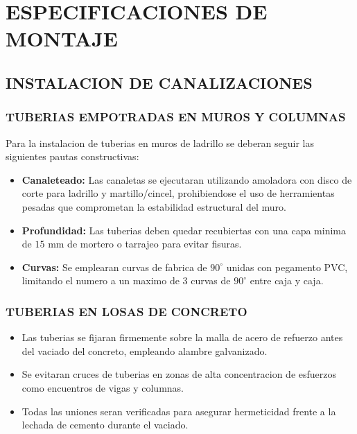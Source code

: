 \chapter*{ESPECIFICACIONES DE MONTAJE}

\iffalse

\section{INSTALACION DE CANALIZACIONES}

\subsection{TUBERIAS EMPOTRADAS EN MUROS Y COLUMNAS}
Para la instalacion de tuberias en muros de ladrillo se deberan seguir las siguientes pautas constructivas:
\begin{itemize}
  \item \textbf{Canaleteado:} Las canaletas se ejecutaran utilizando amoladora con disco de corte para ladrillo y martillo/cincel, prohibiendose el uso de herramientas pesadas que comprometan la estabilidad estructural del muro.
  \item \textbf{Profundidad:} Las tuberias deben quedar recubiertas con una capa minima de \(15\text{ mm}\) de mortero o tarrajeo para evitar fisuras.
  \item \textbf{Curvas:} Se emplearan curvas de fabrica de \(90^\circ\) unidas con pegamento PVC, limitando el numero a un maximo de 3 curvas de \(90^\circ\) entre caja y caja.
\end{itemize}

\subsection{TUBERIAS EN LOSAS DE CONCRETO}
\begin{itemize}
  \item Las tuberias se fijaran firmemente sobre la malla de acero de refuerzo antes del vaciado del concreto, empleando alambre galvanizado.
  \item Se evitaran cruces de tuberias en zonas de alta concentracion de esfuerzos como encuentros de vigas y columnas.
  \item Todas las uniones seran verificadas para asegurar hermeticidad frente a la lechada de cemento durante el vaciado.
\end{itemize}

